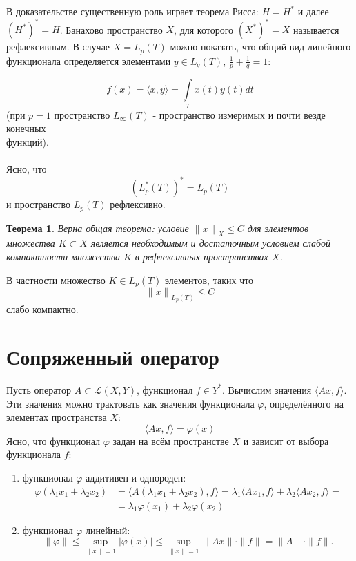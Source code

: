 \documentclass[12pt,a4paper,titlepage,oneside]{book}
\theoremstyle{definition}
\theoremstyle{plain}
\newtheorem*{theorem}{Теорема}
\theoremstyle{break}
\theoremstyle{remark}
\theoremstyle{remark}
\theoremstyle{remark}
\theoremstyle{remark}
\theoremstyle{plain}
\theoremstyle{plain}
\begin{document}
В доказательстве существенную роль играет теорема Рисса: $H=H^*$ и далее $(H^*)^*=H$. Банахово пространство $X$, для которого ${(X^*)}^*=X$ называется рефлексивным. В случае $X=L_p(T)$ можно показать, что общий вид линейного функционала определяется элементами $y \in L_q(T)$, 
$\frac{1}{p}+ \frac{1}{q}=1$:

\begin{equation*}
f(x)= \langle x,y \rangle =\displaystyle\int\limits_T x(t)y(t)dt
\end{equation*}
(при $p=1$ пространство $L_\infty(T)$ - пространство измеримых и почти везде конечных\\ функций).\\\\
Ясно, что 
\begin{equation*}
{(L_p^*(T))}^*=L_p(T)
\end{equation*}
и пространство $L_p(T)$ рефлексивно.
\begin{theorem}
Верна общая теорема: условие ${\lVert x \lVert}_X \leqslant C$ для элементов множества $K \subset X$ является необходимым и достаточным условием слабой компактности множества $K$ в рефлексивных пространствах $X$.
\end{theorem}
В частности множество $K \in L_p(T)$ элементов, таких что 
\begin{equation*}
{\lVert x \lVert}_{L_p(T)} \leqslant C
\end{equation*}
слабо компактно.

\section{Сопряженный оператор}
Пусть оператор $A \subset \mathcal{L}(X,Y)$, функционал $f \in Y^*$. Вычислим значения $ \langle Ax,f \rangle $. Эти значения можно трактовать как значения функционала $\varphi$, определённого на элементах пространства $X$:
\begin{equation}
 \langle Ax,f \rangle =\varphi(x)
\end{equation}
Ясно, что функционал $\varphi$ задан на всём пространстве $X$ и зависит от выбора функционала $f$:
\begin{enumerate}
\item функционал $\varphi$ аддитивен и однороден:
\begin{align*}
\varphi(\lambda_1x_1+\lambda_2x_2) &= 
 \langle A(\lambda_1x_1+\lambda_2x_2),f \rangle =
\lambda_1 \langle Ax_1,f \rangle  + \lambda_2 \langle Ax_2,f \rangle  =\\
&= \lambda_1\varphi(x_1) + \lambda_2\varphi(x_2)
\end{align*}
\item функционал $\varphi$ линейный:
$$\lVert \varphi \lVert \leqslant \underset{\lVert x\lVert =1}{\sup} 
\vert \varphi(x) \vert \leqslant  \underset{\lVert x\lVert =1}{\sup} 
\lVert Ax \lVert \cdot \lVert f \lVert =
 \lVert A \lVert \cdot \lVert f \lVert.$$
\end{enumerate}
\end{document}
